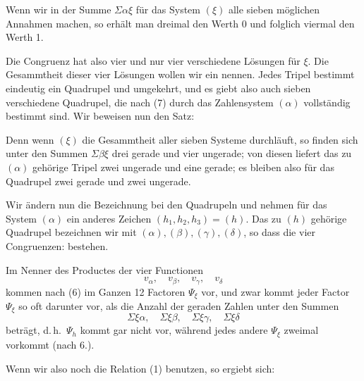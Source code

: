 
Wenn wir in der Summe $\Sigma \alpha\xi$ für das System $(\xi)$ alle sieben möglichen Annahmen machen, so erhält man dreimal den Werth 0 und folglich viermal den Werth 1.

Die Congruenz
hat also vier und nur vier verschiedene Lösungen für $\xi$. Die Gesammtheit dieser vier Lösungen wollen wir ein  nennen. Jedes Tripel bestimmt eindeutig ein Quadrupel und umgekehrt, und es giebt also auch sieben verschiedene Quadrupel, die nach (7) durch das Zahlensystem $(\alpha)$ vollständig bestimmt sind. Wir beweisen nun den Satz:


Denn wenn $(\xi)$ die Gesammtheit aller sieben Systeme durchläuft, so finden sich unter den Summen $\Sigma \beta\xi$ drei gerade und vier ungerade; von diesen liefert das zu $(\alpha)$ gehörige Tripel zwei ungerade und eine gerade; es bleiben also für das Quadrupel zwei gerade und zwei ungerade.

Wir ändern nun die Bezeichnung bei den Quadrupeln und nehmen für das System $(\alpha)$ ein anderes Zeichen $(h_1, h_2, h_3) = (h)$. Das zu $(h)$ gehörige Quadrupel bezeichnen wir mit $(\alpha), (\beta), (\gamma), (\delta)$, so dass die vier Congruenzen:
bestehen.

Im Nenner des Productes der vier Functionen
\[
v_\alpha, \quad v_\beta, \quad v_\gamma, \quad v_\delta
\]
kommen nach (6) im Ganzen 12 Factoren $\Psi_\xi$ vor, und zwar kommt jeder Factor $\Psi_\xi$ so oft darunter vor, als die Anzahl der geraden Zahlen unter den Summen
\[
\Sigma \xi\alpha, \quad \Sigma \xi\beta, \quad \Sigma \xi\gamma, \quad \Sigma \xi\delta
\]
beträgt, d.\,h.\ $\Psi_h$ kommt gar nicht vor, während jedes andere $\Psi_\xi$ zweimal vorkommt (nach 6.).

Wenn wir also noch die Relation (1) benutzen, so ergiebt sich:
